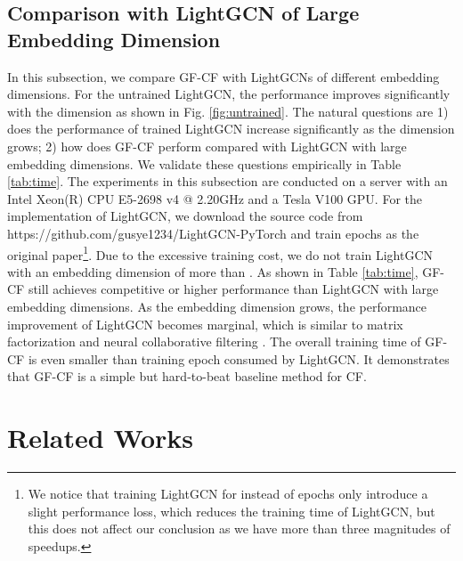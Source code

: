 \documentclass[sigconf]{acmart}
\begin{document}
\subsection{Comparison with LightGCN of Large Embedding Dimension} \label{sec:time}
In this subsection, we compare GF-CF with LightGCNs of different embedding dimensions. For the untrained LightGCN, the performance improves significantly with the dimension as shown in Fig. \ref{fig:untrained}. The natural questions are 1) does the performance of trained LightGCN increase significantly as the dimension grows; 2) how does GF-CF perform compared with LightGCN with large embedding dimensions. We validate these questions empirically in Table \ref{tab:time}. The experiments in this subsection are conducted on a server with an Intel Xeon(R) CPU E5-2698 v4 @ 2.20GHz and a Tesla V100 GPU. For the implementation of LightGCN, we download the source code from https://github.com/gusye1234/LightGCN-PyTorch and train  epochs as the original paper\footnote{We notice that training LightGCN for  instead of  epochs only introduce a slight performance loss, which reduces the training time of LightGCN, but this does not affect our conclusion as we have more than three magnitudes of speedups.}. Due to the excessive training cost, we do not train LightGCN with an embedding dimension of more than . As shown in Table \ref{tab:time}, GF-CF still achieves competitive or higher performance than LightGCN with large embedding dimensions. As the embedding dimension grows, the performance improvement of LightGCN becomes marginal, which is similar to matrix factorization and neural collaborative filtering \cite{rendle2020neural}. The overall training time of GF-CF is even smaller than  training epoch consumed by LightGCN. It demonstrates that GF-CF is a simple but hard-to-beat baseline method for CF.





\section{Related Works}
\label{sec:literature}
\end{document}

